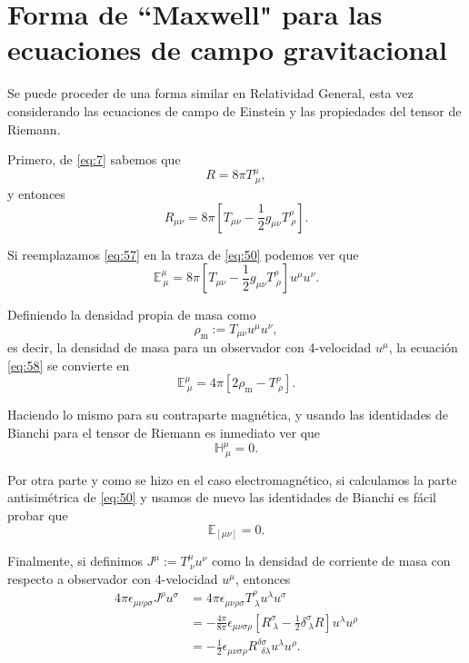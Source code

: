 \section{Forma de ``Maxwell" para las ecuaciones de campo gravitacional}

Se puede proceder de una forma similar en Relatividad General, esta vez considerando las ecuaciones de campo de Einstein y las propiedades del tensor de Riemann. 

Primero, de \eqref{eq:7} sabemos que
\begin{equation}
\label{eq:56}
R = 8 \pi T^{\mu}_{\ \mu},
\end{equation}
y entonces
\begin{equation}
\label{eq:57}
R_{\mu \nu} = 8 \pi \left[ T_{\mu \nu} - \frac{1}{2} g_{\mu \nu} T^{\rho}_{\ \rho} \right].
\end{equation}

Si reemplazamos \eqref{eq:57} en la traza de \eqref{eq:50} podemos ver que
\begin{equation}
\label{eq:58}
\mathbb{E}^{\mu}_{\  \mu} = 8 \pi \left[ T_{\mu \nu} - \frac{1}{2} g_{\mu \nu} T^{\rho}_{\ \rho} \right]u^{\mu} u^{\nu}.
\end{equation}

Definiendo la densidad propia de masa como
\begin{equation}
\rho_{\mathrm{m}} := T_{\mu \nu} u^{\mu} u^{\nu},
\end{equation}
es decir, la densidad de masa para un observador con 4-velocidad $u^{\mu}$, la ecuación \eqref{eq:58} se convierte en
\begin{equation}
\mathbb{E}^{\mu}_{\ \mu} = 4 \pi \left[ 2\rho_{\mathrm{m}} - T^{\rho}_{\ \rho} \right].
\end{equation}

Haciendo lo mismo para su contraparte magnética, y usando las identidades de Bianchi para el tensor de Riemann es inmediato ver que
\begin{equation}
\mathbb{H}^{\mu}_{\ \mu} = 0.
\end{equation} 

Por otra parte y como se hizo en el caso electromagnético, si calculamos la parte antisimétrica de 
\eqref{eq:50} y usamos de nuevo las identidades de Bianchi es fácil probar que
\begin{equation}
\label{eq:59}
\mathbb{E}_{[\mu \nu]} = 0.
\end{equation}

Finalmente, si definimos $J^{\mu} := T^{\mu}_{\ \nu} u^{\nu}$ como la densidad de corriente de masa con respecto a observador con 4-velocidad $u^{\mu}$, entonces
\begin{align}
\nonumber
4 \pi \epsilon_{\mu \nu \rho \sigma} J^{\rho} u^{\sigma} &= 4 \pi \epsilon_{\mu \nu \rho \sigma} T^{\rho}_{\ \lambda} u^{\lambda} u^{\sigma} \\
\nonumber
&= - \frac{4 \pi}{8 \pi} \epsilon_{\mu \nu \sigma \rho} \left[ R^{\sigma}_{\ \lambda} - \frac{1}{2}
\delta^{\sigma}_{\ \lambda} R \right] u^{\lambda} u^{\rho} \\
\nonumber
&= - \frac{1}{2} \epsilon_{\mu \nu \sigma \rho} R^{\delta \sigma}_{\ \ \delta \lambda} u^{\lambda} u^{\rho}.
\end{align}

